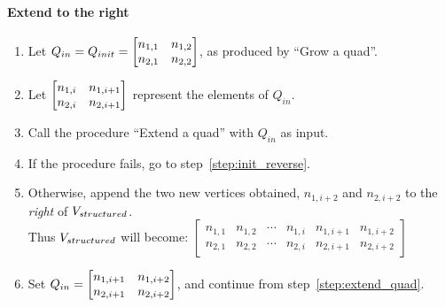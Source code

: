 \paragraph{Extend to the right}
\begin{enumerate}
\item Let $Q_{in} = Q_{init} = \begin{bmatrix} n_{1,1} & n_{1,2} \\ n_{2,1} & n_{2,2} \end{bmatrix}$, as produced by ``Grow a quad''.
\item \label{step:extend_quad} Let $\begin{bmatrix} n_{1,i} & n_{1,i+1} \\ n_{2,i} & n_{2,i+1} \end{bmatrix}$ represent the elements of $Q_{in}$.
\item Call the procedure ``Extend a quad'' with $Q_{in}$ as input.
\item If the procedure fails, go to step~\ref{step:init_reverse}.
\item Otherwise, append the two new vertices obtained, $n_{1,i+2}$ and $n_{2,i+2}$ to the \emph{right} of $V_{structured}$. \\
Thus $V_{structured}$ will become:
	$\begin{bmatrix}
	n_{1,1} & n_{1,2} & \cdots  & n_{1,i} & n_{1,i+1} & n_{1,i+2} \\
	n_{2,1} & n_{2,2} & \cdots  & n_{2,i} & n_{2,i+1} & n_{2,i+2}
	\end{bmatrix}$

\item Set $Q_{in} = \begin{bmatrix} n_{1,i+1} & n_{1,i+2} \\ n_{2,i+1} & n_{2,i+2} \end{bmatrix}$, and continue from step~\ref{step:extend_quad}.

\end{enumerate}
